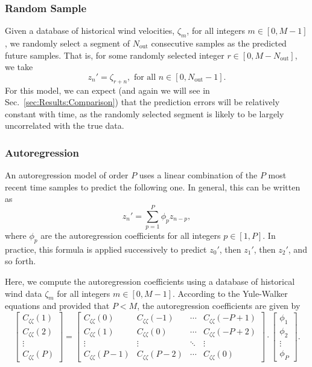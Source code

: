 \documentclass[11pt, oneside]{article}
\newcommand{\secref}[1]{Sec.~\ref{#1}}
\begin{document}
\subsubsection{Random Sample}
Given a database of historical wind velocities, $\zeta_m$, for all integers $m \in [0, M-1]$, we randomly select a segment of $N_\text{out}$ consecutive samples as the predicted future samples.
That is, for some randomly selected integer $r \in [0, M - N_\text{out}]$, we take
\begin{equation}
z_n' = \zeta_{r+n}, \text{ for all } n \in [0, N_\text{out} - 1].
\end{equation}
For this model, we can expect (and again we will see in \secref{sec:Results:Comparison}) that the prediction errors will be relatively constant with time, as the randomly selected segment is likely to be largely uncorrelated with the true data.

\subsubsection{Autoregression}\label{sec:Models:Autoregression}
An autoregression model of order $P$ uses a linear combination of the $P$ most recent time samples to predict the following one.
In general, this can be written as
\begin{equation}
z_n' = \sum_{p = 1}^P \phi_p z_{n-p},
\end{equation}
where $\phi_p$ are the autoregression coefficients for all integers $p \in [1, P]$.
In practice, this formula is applied successively to predict $z_0'$, then $z_1'$, then $z_2'$, and so forth.

Here, we compute the autoregression coefficients using a database of historical wind data $\zeta_m$ for all integers $m \in [0, M-1]$.
According to the Yule-Walker equations and provided that $P < M$, the autoregression coefficients are given by \citep[Sec.~3.1.1]{Chatfield2000}
\begin{equation}
\begin{bmatrix}
C_{\zeta \zeta}(1) \\
C_{\zeta \zeta}(2) \\
\vdots \\
C_{\zeta \zeta}(P)
\end{bmatrix}
=
\begin{bmatrix}
C_{\zeta \zeta}(0) & C_{\zeta \zeta}(-1) & \cdots & C_{\zeta \zeta} (-P+1) \\
C_{\zeta \zeta}(1) & C_{\zeta \zeta}(0) & \cdots & C_{\zeta \zeta} (-P+2) \\
\vdots & \vdots & \ddots & \vdots \\
C_{\zeta \zeta}(P-1) & C_{\zeta \zeta}(P-2) & \cdots & C_{\zeta \zeta}(0)
\end{bmatrix}
\cdot
\begin{bmatrix}
\phi_1 \\
\phi_2 \\
\vdots \\
\phi_P
\end{bmatrix}.
\end{equation}
\end{document}
